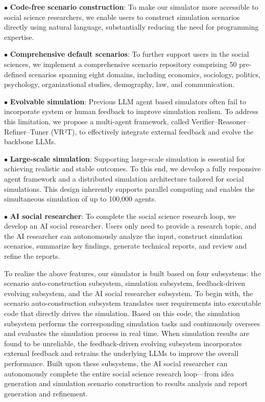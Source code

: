 \documentclass{article}
\theoremstyle{definition}
\theoremstyle{theorem}
\theoremstyle{proof}
\theoremstyle{remark}
\begin{document}
    $\bullet$ \textbf{Code-free scenario construction}:
    To make our simulator more accessible to social science researchers, we enable users to construct simulation scenarios directly using natural language, substantially reducing the need for programming expertise.
    
    $\bullet$ \textbf{Comprehensive default scenarios}: 
    To further support users in the social sciences, we implement a comprehensive scenario repository comprising 50 pre-defined scenarios spanning eight domains, including economics, sociology, politics, psychology, organizational studies, demography, law, and communication.

    $\bullet$ \textbf{Evolvable simulation}: 
    Previous LLM agent based simulators often fail to incorporate system or human feedback to improve simulation realism. To address this limitation, we propose a multi-agent framework, called Verifier–Reasoner–Refiner–Tuner (VR²T), to effectively integrate external feedback and evolve the backbone LLMs.

    $\bullet$ \textbf{Large-scale simulation}: 
    Supporting large-scale simulation is essential for achieving realistic and stable outcomes. To this end, we develop a fully responsive agent framework and a distributed simulation architecture tailored for social simulations. This design inherently supports parallel computing and enables the simultaneous simulation of up to 100,000 agents.


    $\bullet$ \textbf{AI social researcher}: 
    To complete the social science research loop, we develop an AI social researcher. Users only need to provide a research topic, and the AI researcher can autonomously analyze the input, construct simulation scenarios, summarize key findings, generate technical reports, and review and refine the reports.

    To realize the above features, our simulator is built based on four subsystems: the scenario auto-construction subsystem, simulation subsystem, feedback-driven evolving subsystem, and the AI social researcher subsystem. To begin with, the scenario auto-construction subsystem translates user requirements into executable code that directly drives the simulation. Based on this code, the simulation subsystem performs the corresponding simulation tasks and continuously oversees and evaluates the simulation process in real time. 
    When simulation results are found to be unreliable, the feedback-driven evolving subsystem incorporates external feedback and retrains the underlying LLMs to improve the overall performance. Built upon these subsystems, the AI social researcher can autonomously complete the entire social science research loop—from idea generation and simulation scenario construction to results analysis and report generation and refinement.
\end{document}
